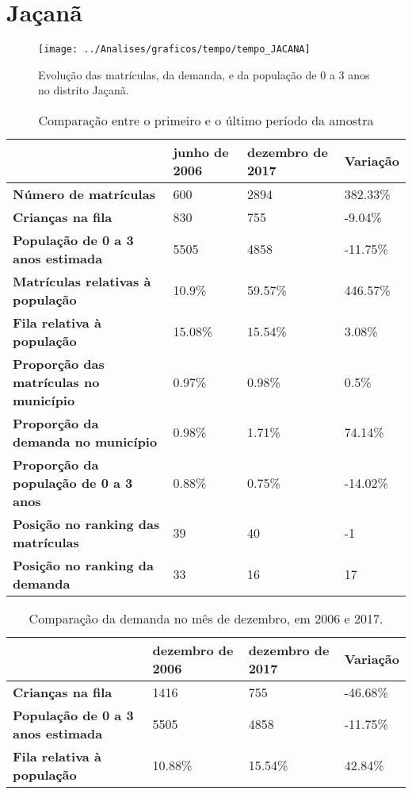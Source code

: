 \section{Jaçanã}
\begin{figure}[H]
\centering
\texttt{[image: ../Analises/graficos/tempo/tempo\_JACANA]}
\caption{Evolução das matrículas, da demanda, e da população de 0 a 3 anos no distrito Jaçanã.}
\end{figure}
\begin{table}[H]
\begin{tabular}{|l|l|l|l|}
\hline
\textbf{}                                      & \textbf{junho de 2006}       & \textbf{dezembro de 2017}    & \textbf{Variação} \\ \hline
\textbf{Número de matrículas}                  & 600 & 2894 & 382.33\% \\ \hline
\textbf{Crianças na fila}                      & 830 & 755 & -9.04\% \\ \hline
\textbf{População de 0 a 3 anos estimada}      & 5505 & 4858 & -11.75\% \\ \hline
\textbf{Matrículas relativas à população}      & 10.9\% & 59.57\% & 446.57\% \\ \hline
\textbf{Fila relativa à população}             & 15.08\% & 15.54\% & 3.08\% \\ \hline
\textbf{Proporção das matrículas no município} & 0.97\% & 0.98\% & 0.5\% \\ \hline
\textbf{Proporção da demanda no município}     & 0.98\% & 1.71\% & 74.14\% \\ \hline
\textbf{Proporção da população de 0 a 3 anos}  & 0.88\% & 0.75\% & -14.02\% \\ \hline
\textbf{Posição no ranking das matrículas}     & 39 & 40 & -1 \\ \hline
\textbf{Posição no ranking da demanda}         & 33 & 16 & 17 \\ \hline
\end{tabular}
\caption{Comparação entre o primeiro e o último período da amostra}
\end{table}
\begin{table}[H]
\begin{tabular}{|l|l|l|l|}
\hline
\textbf{}                                 & \textbf{dezembro de 2006} & \textbf{dezembro de 2017} & \textbf{Variação} \\ \hline
\textbf{Crianças na fila}                      & 1416 & 755 & -46.68\% \\ \hline
\textbf{População de 0 a 3 anos estimada}      & 5505 & 4858 & -11.75\% \\ \hline
\textbf{Fila relativa à população}             & 10.88\% & 15.54\% & 42.84\% \\ \hline
\end{tabular}
\caption{Comparação da demanda no mês de dezembro, em 2006 e 2017.}
\end{table}
